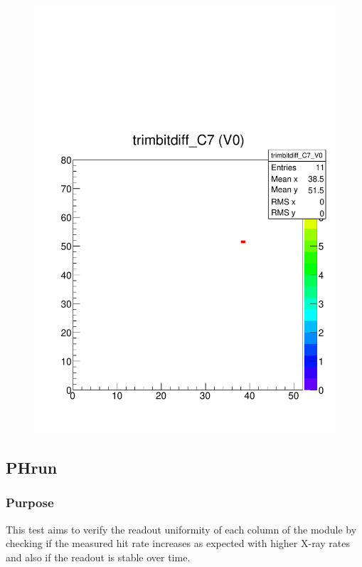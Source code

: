 \documentclass[a4paper,12pt,twoside]{article}
\begin{document}
\begin{figure}
\begin{minipage}[t]{.48\textwidth}
  \centering
  \includegraphics[width=\textwidth]{./Figures/RetrimHotPixels_TrimBitDiff.pdf}
  \label{RetrimHotPixels-TrimbitHitmap}
\end{minipage}
\end{figure}

\subsection{PHrun}
\subsubsection{Purpose}
This test aims to verify the readout uniformity of each column of the module by checking if the measured hit rate increases as expected with higher X-ray rates and also if the readout is stable over time.
\end{document}
